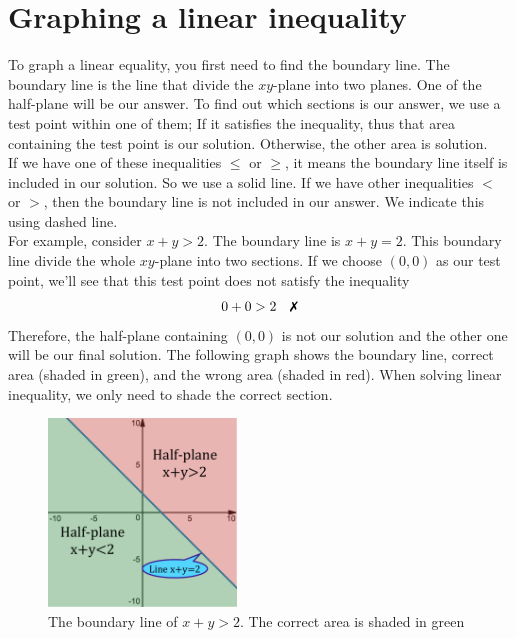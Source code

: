 \section{Graphing a linear inequality}
To graph a linear equality, you first need to find the boundary line. The boundary line is the line that divide the $xy$-plane into two planes. One of the half-plane will be our answer. To find out which sections is our answer, we use a test point within one of them; If it satisfies the inequality, thus that area containing the test point is our solution. Otherwise, the other area is solution.\\
If we have one of these inequalities $\leq$ or $\geq$, it means the boundary line itself is included in our solution. So we use a solid line. If we have other inequalities $<$ or $>$, then the boundary line is not included in our answer. We indicate this using dashed line.\\
For example, consider $x+y>2$. The boundary line is $x+y=2$. This boundary line divide the whole $xy$-plane into two sections. If we choose $(0,0)$ as our test point, we'll see that this test point does not satisfy the inequality
    \[
        0+0>2 \quad \xmark
    \]
Therefore, the half-plane containing $(0,0)$ is not our solution and the other one will be our final solution. The following graph shows the boundary line, correct area (shaded in green), and the wrong area (shaded in red). When solving linear inequality, we only need to shade the correct section.
\begin{figure}[H]
 \includegraphics[width=5cm]{pics/line.png}
 \centering
  \caption{The boundary line of $x+y>2$. The correct area is shaded in green}
\end{figure}
